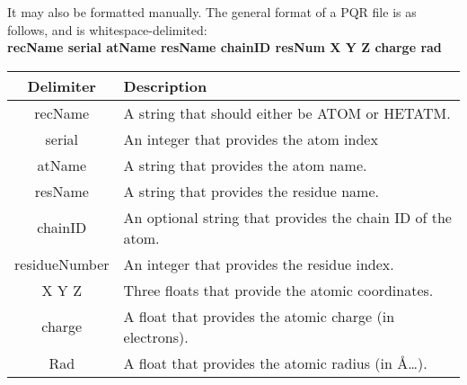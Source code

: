 It may also be formatted manually. The general format of a PQR file is as follows, and is whitespace-delimited: \\

\textbf{recName  serial  atName  resName  chainID  resNum  X  Y  Z  charge rad }\\

  \begin{tabular}{ c | l  }
    \textbf{Delimiter} & \textbf{Description} \\ \hline
recName 	&	A string that should either be ATOM or HETATM. \\
serial 	&	An integer that provides the atom index \\
atName 	&	A string that provides the atom name.\\
resName	&	A string that provides the residue name. \\
chainID	&	An optional string that provides the chain ID of the atom.\\
residueNumber  & An integer that provides the residue index.\\
X Y Z	& Three floats that provide the atomic coordinates.\\
charge	& A float that provides the atomic charge (in electrons). \\
Rad		& A float that provides the atomic radius (in \AA…).\\
    \hline
  \end{tabular}


\clearpage

